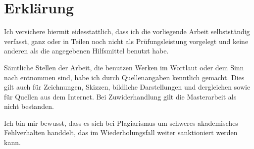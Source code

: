 \chapter*{Erklärung}
\begin{otherlanguage}{ngerman}
Ich versichere hiermit eidesstattlich, dass ich die vorliegende Arbeit
selbstständig verfasst, ganz oder in Teilen noch nicht als
Prüfungsleistung vorgelegt und keine anderen als die angegebenen
Hilfsmittel benutzt habe.

Sämtliche Stellen der Arbeit, die benutzen Werken im Wortlaut oder dem
Sinn nach entnommen sind, habe ich durch Quellenangaben kenntlich
gemacht. Dies gilt auch für Zeichnungen, Skizzen, bildliche
Darstellungen und dergleichen sowie für Quellen aus dem Internet. Bei
Zuwiderhandlung gilt die Masterarbeit als nicht bestanden.

Ich bin mir bewusst, dass es sich bei Plagiarismus um schweres
akademisches Fehlverhalten handdelt, das im Wiederholungsfall weiter
sanktioniert werden kann.

{
    \vskip3cm
    \par\noindent\makebox[7cm]{\hrulefill} \hfill\makebox[7cm]{\hrulefill}
    \par\noindent{}      \hfill{}
}
\end{otherlanguage}
